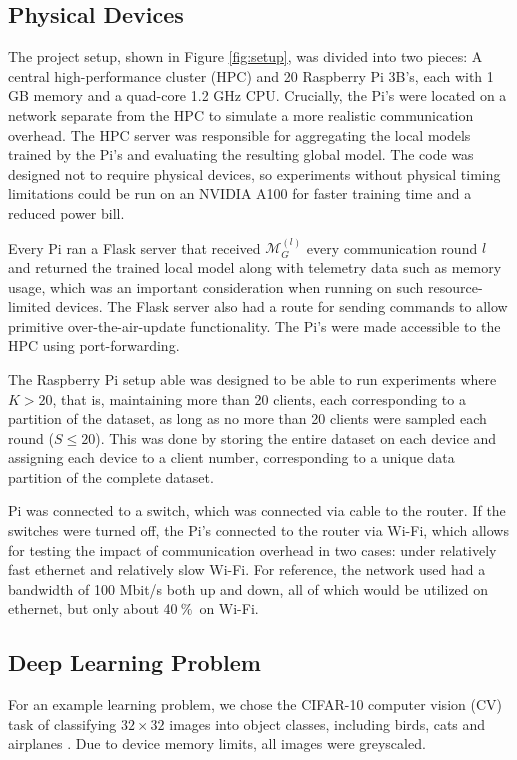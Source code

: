 \documentclass{article}
\newcommand{\unit}[1]{\ensuremath{\:\text{#1}}}
\newcommand{\pro}{\ensuremath{\unit{\%{}}}}
\begin{document}
\subsection{Physical Devices}
The project setup, shown in Figure \ref{fig:setup}, was divided into two pieces: A central high-performance cluster (HPC) and 20 Raspberry Pi 3B's, each with 1 GB memory and a quad-core 1.2 GHz CPU.
Crucially, the Pi's were located on a network separate from the HPC to simulate a more realistic communication overhead.
The HPC server was responsible for aggregating the local models trained by the Pi's and evaluating the resulting global model.
The code was designed not to require physical devices, so experiments without physical timing limitations could be run on an NVIDIA A100 for faster training time and a reduced power bill.

Every Pi ran a Flask server that received $\mathcal M_G^{(l)}$ every communication round $l$ and returned the trained local model along with telemetry data such as memory usage, which was an important consideration when running on such resource-limited devices.
The Flask server also had a route for sending commands to allow primitive over-the-air-update functionality.
The Pi's were made accessible to the HPC using port-forwarding.

The Raspberry Pi setup able was designed to be able to run experiments where $K > 20$, that is, maintaining more than 20 clients, each corresponding to a partition of the dataset, as long as no more than 20 clients were sampled each round ($S \leq 20$).
This was done by storing the entire dataset on each device and assigning each device to a client number, corresponding to a unique data partition of the complete dataset.

 Pi was connected to a switch, which was connected via cable to the router.
If the switches were turned off, the Pi's connected to the router via Wi-Fi, which allows for testing the impact of communication overhead in two cases: under relatively fast ethernet and relatively slow Wi-Fi.
For reference, the network used had a bandwidth of 100 Mbit/s both up and down, all of which would be utilized on ethernet, but only about 40\pro\ on Wi-Fi.

\subsection{Deep Learning Problem}
For an example learning problem, we chose the CIFAR-10 computer vision (CV) task of classifying $32\times 32$ images into object classes, including birds, cats and airplanes \cite{alex2009learning}.
Due to device memory limits, all images were greyscaled.
\end{document}
